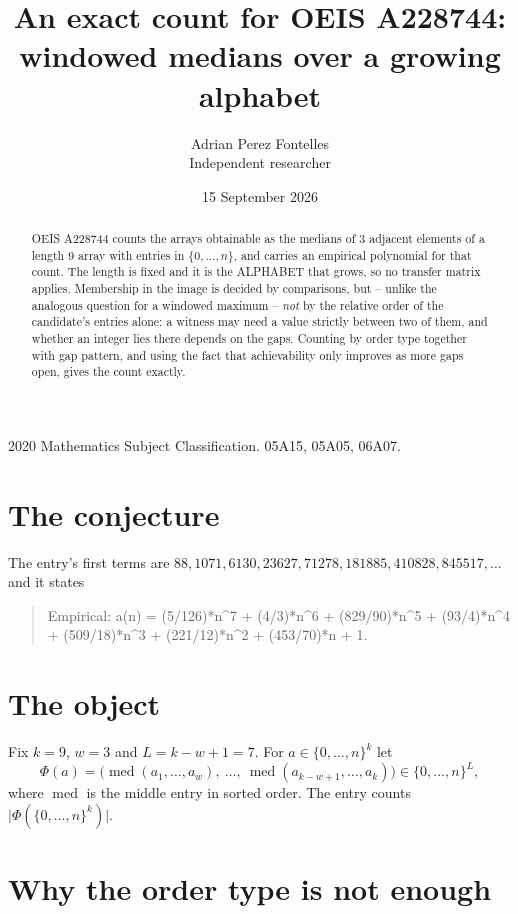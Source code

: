 \documentclass[11pt,a4paper]{article}
\title{An exact count for OEIS A228744: windowed medians over a growing alphabet}
\author{Adrian Perez Fontelles\\ \small Independent researcher}
\date{15 September 2026}
\theoremstyle{plain}
\theoremstyle{definition}
\begin{document}
\maketitle

\begin{abstract}
OEIS A228744 counts the arrays obtainable as the medians of $3$ adjacent elements of a length
$9$ array with entries in $\{0,\dots,n\}$, and carries an empirical polynomial for that
count. The length is fixed and it is the ALPHABET that grows, so no transfer matrix applies.
Membership in the image is decided by comparisons, but -- unlike the analogous question for a
windowed maximum -- \emph{not} by the relative order of the candidate's entries alone: a
witness may need a value strictly between two of them, and whether an integer lies there depends
on the gaps. Counting by order type together with gap pattern, and using the fact that
achievability only improves as more gaps open, gives the count exactly.
\end{abstract}

\noindent\small 2020 Mathematics Subject Classification. 05A15, 05A05, 06A07.\normalsize

\section{The conjecture}

The entry's first terms are $88, 1071, 6130, 23627, 71278, 181885, 410828, 845517,\dots$ and it states

\begin{quote}\raggedright Empirical: a(n) = (5/126)*n\^{}7 + (4/3)*n\^{}6 + (829/90)*n\^{}5 + (93/4)*n\^{}4 + (509/18)*n\^{}3 + (221/12)*n\^{}2 + (453/70)*n + 1.\end{quote}

\section{The object}

Fix $k=9$, $w=3$ and $L=k-w+1=7$. For $a\in\{0,\dots,n\}^k$ let
\[
  \Phi(a)=\bigl(\operatorname{med}(a_1,\dots,a_w),\ \dots,\
  \operatorname{med}(a_{k-w+1},\dots,a_k)\bigr)\in\{0,\dots,n\}^{L} ,
\]
where $\operatorname{med}$ is the middle entry in sorted order. The entry counts
$\lvert\Phi(\{0,\dots,n\}^k)\rvert$.

\section{Why the order type is not enough}
\end{document}
